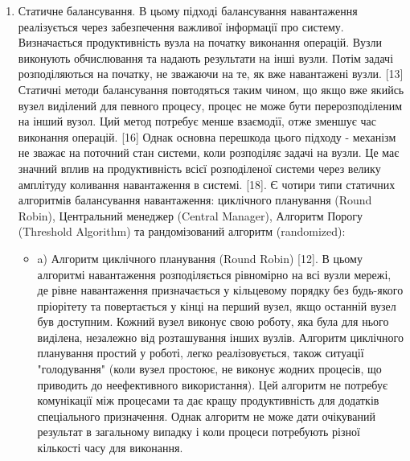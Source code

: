\documentclass[14pt]{vakthesis}
\begin{document}
\begin{enumerate}
\item Статичне балансування. В цьому підході балансування навантаження реалізується через забезпечення важливої інформації про систему. Визначається продуктивність вузла на початку виконання операцій. Вузли виконують обчислювання та надають результати на інші вузли. Потім задачі розподіляються на початку, не зважаючи на те, як вже навантажені вузли. [13]
Статичні методи балансування повтодяться таким чином, що якщо вже якийсь вузел виділений для певного процесу, процес не може бути перерозподіленим на інший вузол.
Ций метод потребує менше взаємодії, отже зменшує час виконання операцій. [16]
Однак основна перешкода цього підходу - механізм не зважає на поточний стан системи, коли розподіляє задачі на вузли.
Це має значний вплив на продуктивність всієї розподіленої системи через велику амплітуду коливання навантаження в системі. [18]. 
Є чотири типи статичних алгоритмів балансування навантаження: циклічного планування (Round Robin), Центральний менеджер (Central Manager), 
Алгоритм Порогу (Threshold Algorithm) та рандомізований алгоритм (randomized):

\begin{itemize}

\item a)  Алгоритм циклічного планування (Round Robin)  [12]. В цьому алгоритмі навантаження розподіляється рівномірно на всі вузли мережі, де рівне навантаження призначається у кільцевому порядку без будь-якого пріорітету та повертається у кінці на перший вузел, якщо останній вузел був доступним. 
Кожний вузел  виконує свою роботу, яка була для нього виділена, незалежно від розташування інших вузлів. Алгоритм циклічного планування простий у роботі, легко реалізовується, також ситуації "голодування" (коли вузел простоює, не виконує жодних процесів, що приводить до неефективного використання).  
Цей алгоритм не потребує комунікації між процесами та дає кращу продуктивність для додатків спеціального призначення. 
Однак алгоритм не може дати очікуваний результат в загальному випадку і коли процеси потребують різної кількості часу для виконання. 


\end{itemize}
\end{enumerate}
\end{document}
